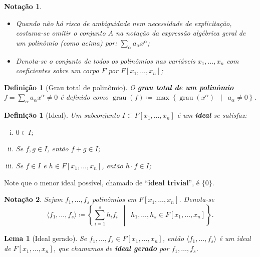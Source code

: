 \documentclass[12pt,a4paper]{report}
\newcommand{\suchthat}{\enspace\middle|\enspace}
\newtheorem{definition}[theorem]{Definição}
\newtheorem{lemma}[theorem]{Lema}
\newtheorem*{notation}{Notação}
\numberwithin{theorem}{chapter}
\DeclareMathOperator{\grau}{grau}
\begin{document}
\begin{notation}\mbox{}
  \begin{itemize}
  \item Quando não há risco de ambiguidade nem necessidade de
    explicitação, costuma-se omitir o conjunto \(A\) na notação da
    expressão algébrica geral de um polinômio (como acima) por:
    \(\sum\limits_{\alpha} a_{\alpha}x^\alpha\);

  \item Denota-se o conjunto de todos os polinômios nas variáveis
    \(x_1,\ldots,x_n\) com coeficientes sobre um corpo \(F\) por
    \(F[x_1,\ldots,x_n]\);
  \end{itemize}
\end{notation}

\begin{definition}[Grau total de polinômio]
  O \textbf{grau total de um polinômio} \(f = \sum\limits_{\alpha}
  a_{\alpha}x^\alpha \neq 0\) é definido como \(\grau(f) \coloneqq
  \max\left\{\grau(x^\alpha) \suchthat a_{\alpha} \neq 0\right\}\).
\end{definition}

\begin{definition}[Ideal]
  Um subconjunto \(I \subset F[x_1,\ldots,x_n]\) é um \textbf{ideal}
  se satisfaz:
  \begin{enumerate}[(i)]
    \item \(0 \in I\);
    \item Se \(f, g \in I\), então \(f + g \in I\);
    \item Se \(f \in I\) e \(h \in F[x_1,\ldots,x_n]\), então \(h
      \cdot f \in I\);
  \end{enumerate}
\end{definition}

Note que o menor ideal possível, chamado de ``\textbf{ideal trivial}'', é
\(\{0\}\).

\begin{notation}
  Sejam \(f_1,\ldots,f_s\) polinômios em \(F[x_1,\ldots,x_n]\).
  Denota-se \[\langle f_1,\ldots,f_s \rangle \coloneqq \left\{
    \sum\limits_{i=1}^s{h_if_i} \suchthat h_1,\ldots,h_s \in
    F[x_1,\ldots,x_n]\right\}.\]
\end{notation}

\begin{lemma}[Ideal gerado]
  Se \(f_1,\ldots,f_s \in F[x_1,\ldots,x_n]\), então \(\langle
  f_1,\ldots,f_s \rangle\) é um ideal de \(F[x_1,\ldots,x_n]\), que
  chamamos de \textbf{ideal gerado} por \(f_1,\ldots,f_s\).
\end{lemma}
\end{document}
